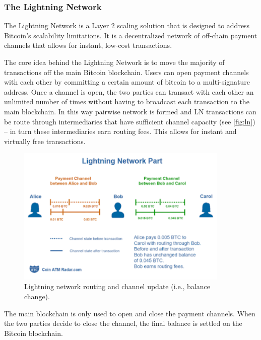 \subsubsection{The Lightning Network}\label{the-lightning-network}

The Lightning Network is a Layer 2 scaling solution that is designed to
address Bitcoin's scalability limitations. It is a decentralized network
of off-chain payment channels that allows for instant, low-cost
transactions.

The core idea behind the Lightning Network is to move the majority of
transactions off the main Bitcoin blockchain. Users can open payment
channels with each other by committing a certain amount of bitcoin to a
multi-signature address. Once a channel is open, the two parties can
transact with each other an unlimited number of times without having to
broadcast each transaction to the main blockchain. In this way pairwise network is formed and LN transactions can be route through intermediaries that have sufficient channel capacity (see \autoref{fig:ln}) -- in turn these intermediaries earn routing fees. This allows for instant and virtually free transactions.

\begin{figure}[t]
	\begin{center}
		\includegraphics[width=0.9\textwidth]{./figs/ln.png}
		\caption{Lightning network routing and channel update (i.e., balance change).}		
		\label{fig:ln}
	\end{center}	
\end{figure}

The main blockchain is only used to open and close the payment channels.
When the two parties decide to close the channel, the final balance is
settled on the Bitcoin blockchain.


